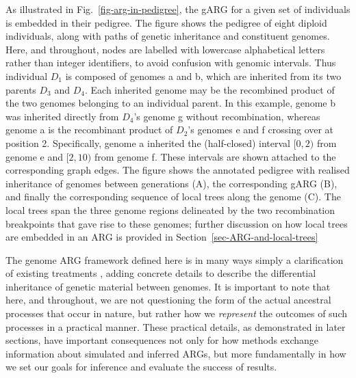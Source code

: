\documentclass{article}
\newcommand{\noderef}[1]{\textsf{#1}}
\begin{document}
As illustrated in Fig.~\ref{fig-arg-in-pedigree},
the gARG for a given set of individuals is embedded in their pedigree.
The figure shows the pedigree of eight diploid individuals, along with paths
of genetic inheritance and constituent genomes.
Here, and throughout,
nodes are labelled with lowercase alphabetical letters
rather than integer identifiers, to avoid confusion with genomic intervals.
Thus individual $D_1$ is composed
of genomes \noderef{a} and \noderef{b}, which are inherited from its
two parents $D_3$ and $D_4$. Each inherited genome may be the recombined product
of the two genomes belonging to an individual parent.
In this example,
genome \noderef{b} was inherited directly from $D_4$'s genome \noderef{g} without
recombination, whereas
genome \noderef{a} is the recombinant product of
$D_2$'s genomes \noderef{e} and \noderef{f} crossing over at position 2.
Specifically, genome \noderef{a} inherited the (half-closed)
interval $[0, 2)$ from genome \noderef{e} and $[2, 10)$ from genome \noderef{f}.
These intervals are shown attached to the corresponding graph edges.
The figure shows the annotated pedigree with realised inheritance of genomes
between generations (A), the corresponding gARG (B), and finally the corresponding
sequence of local trees along the
genome (C).
The local trees span the three genome regions delineated
by the two recombination breakpoints that gave rise to these genomes;
further discussion on
how local trees are embedded in an ARG is provided in Section~\ref{sec-ARG-and-local-trees}

The genome ARG framework defined here is
in many ways simply a clarification of existing treatments
\cite[e.g.][]{mathieson2020ancestry,shipilina2023origin},
adding concrete details to describe the
differential inheritance of genetic material between genomes.
It is important to note that here, and throughout,
we are not questioning the form of the
actual ancestral processes that occur in nature, but rather how we
\emph{represent} the outcomes of such processes in a practical manner.
These practical details,
as demonstrated in later sections, have important
consequences not only for how methods exchange information about
simulated and inferred ARGs, but more fundamentally in
how we set our goals for inference and evaluate the success of results.
\end{document}
